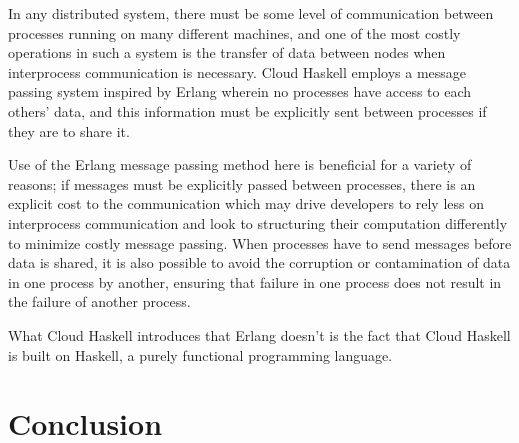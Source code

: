 \documentclass[10pt,a4paper,twocolumn]{article}
\begin{document}
In any distributed system, there must be some level of communication between
processes running on many different machines, and one of the most costly
operations in such a system is the transfer of data between nodes when
interprocess communication is necessary. Cloud Haskell employs a message passing
system inspired by Erlang wherein no processes have access to each others' data,
and this information must be explicitly sent between processes if they are to
share it.

Use of the Erlang message passing method here is beneficial for a variety of
reasons; if messages must be explicitly passed between processes, there is an
explicit cost to the communication which may drive developers to rely less on
interprocess communication and look to structuring their computation differently
to minimize costly message passing. When processes have to send messages before
data is shared, it is also possible to avoid the corruption or contamination of
data in one process by another, ensuring that failure in one process does not
result in the failure of another process.

What Cloud Haskell introduces that Erlang doesn't is the fact that Cloud Haskell
is built on Haskell, a purely functional programming language.

\section{Conclusion}





\small



\end{document}
